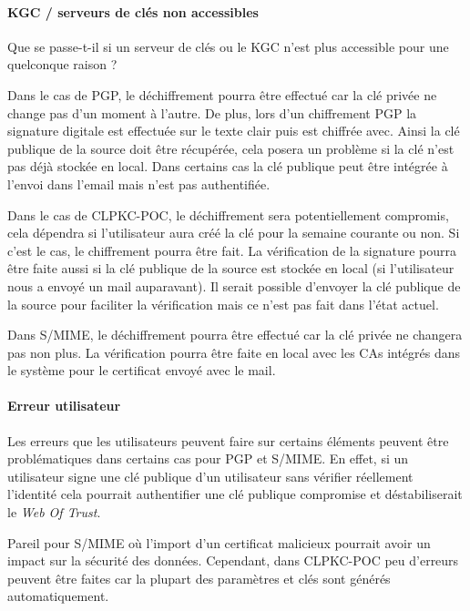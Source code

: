 \paragraph*{KGC / serveurs de clés non accessibles}
Que se passe-t-il si un serveur de clés ou le KGC n'est plus accessible pour une quelconque raison ?

Dans le cas de PGP, le déchiffrement pourra être effectué car la clé privée ne change pas d'un moment à l'autre. De plus, lors d'un chiffrement PGP la signature digitale est effectuée sur le texte clair puis est chiffrée avec. Ainsi la clé publique de la source doit être récupérée, cela posera un problème si la clé n'est pas déjà stockée en local. Dans certains cas la clé publique peut être intégrée à l'envoi dans l'email mais n'est pas authentifiée.

Dans le cas de CLPKC-POC, le déchiffrement sera potentiellement compromis, cela dépendra si l'utilisateur aura créé la clé pour la semaine courante ou non. Si c'est le cas, le chiffrement pourra être fait. La vérification de la signature pourra être faite aussi si la clé publique de la source est stockée en local (si l'utilisateur nous a envoyé un mail auparavant). Il serait possible d'envoyer la clé publique de la source pour faciliter la vérification mais ce n'est pas fait dans l'état actuel.

Dans S/MIME, le déchiffrement pourra être effectué car la clé privée ne changera pas non plus. La vérification pourra être faite en local avec les CAs intégrés dans le système pour le certificat envoyé avec le mail.
\paragraph*{Erreur utilisateur}
Les erreurs que les utilisateurs peuvent faire sur certains éléments peuvent être problématiques dans certains cas pour PGP et S/MIME. En effet, si un utilisateur signe une clé publique d'un utilisateur sans vérifier réellement l'identité cela pourrait authentifier une clé publique compromise et déstabiliserait le \textit{Web Of Trust}.

 Pareil pour S/MIME où l'import d'un certificat malicieux pourrait avoir un impact sur la sécurité des données. Cependant, dans CLPKC-POC peu d'erreurs peuvent être faites car la plupart des paramètres et clés sont générés automatiquement.